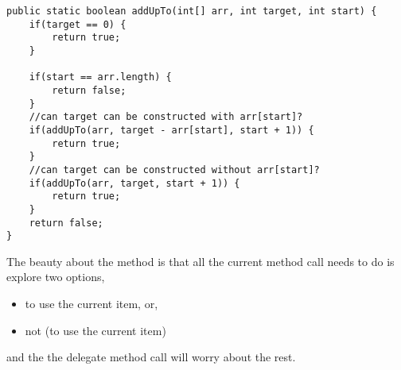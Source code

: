 \newpage

\begin{lstlisting}
public static boolean addUpTo(int[] arr, int target, int start) {
	if(target == 0) {
		return true;
	}
	
	if(start == arr.length) {
		return false;
	}
	//can target can be constructed with arr[start]?
	if(addUpTo(arr, target - arr[start], start + 1)) {
		return true;
	}
	//can target can be constructed without arr[start]?
	if(addUpTo(arr, target, start + 1)) {
		return true;
	}
	return false;
}
\end{lstlisting}

The beauty about the method is that all the current method call needs to do is explore two options, 

\begin{itemize}
  \item to use the current item, or,
  \item not (to use the current item)
\end{itemize}

and the the delegate method call will worry about the rest.

